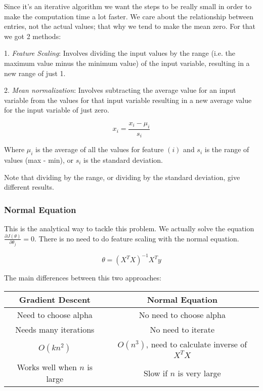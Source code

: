 Since it's an iterative algorithm we want the steps to be really small in order to make the computation time a lot faster. We care about the relationship between entries, not the actual values; that why we tend to make the mean zero. For that we got 2 methods:

1. \textit{Feature Scaling}: Involves dividing the input values by the range (i.e. the maximum value minus the minimum value) of the input variable, resulting in a new range of just 1.

2. \textit{Mean normalization}: Involves subtracting the average value for an input variable from the values for that input variable resulting in a new average value for the input variable of just zero.

$$x_i = \frac{x_i - \mu_i}{s_i}$$

Where $\mu_i$ is the average of all the values for feature $(i)$ and $s_i$ is the range of values (max - min), or $s_i$ is the standard deviation.

Note that dividing by the range, or dividing by the standard deviation, give different results. 

\subsubsection{Normal Equation}
This is the analytical way to tackle this problem. We actually solve the equation $\frac{\partial{J(\theta)}}{\partial{\theta_{j}}} = 0$. There is no need to do feature scaling with the normal equation.

$$\theta = (X^TX)^{-1}X^Ty$$


The main differences between this two approaches:



\begin{center}
\begin{tabular}{ |c|c| } 
\hline
\textbf{Gradient Descent} & \textbf{Normal Equation} \\
\hline
Need to choose alpha & No need to choose alpha \\
\hline
Needs many iterations & No need to iterate \\
\hline
$O(kn^2)$ & $O(n^3)$, need to calculate inverse of $X^TX$ \\
\hline
Works well when $n$ is large & Slow if $n$ is very large \\
\hline
\end{tabular}
\end{center}

